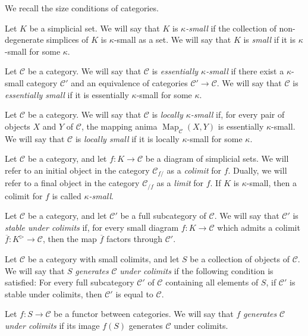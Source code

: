 \documentclass[a4paper,dvipdfmx,11pt,reqno]{amsart}
\DeclareMathOperator{\Map}{Map}
\newcommand{\C}{\mathcal{C}}
\begin{document}
We recall the size conditions of categories.

\begin{definition}
  Let $K$ be a simplicial set.
  We will say that $K$ is \textit{$\kappa$-small} if the collection of non-degenerate simplices of $K$ is $\kappa$-small as a set.
  We will say that $K$ is \textit{small} if it is $\kappa$-small for some $\kappa$.
\end{definition}

\begin{definition}
  Let $\C$ be a category.
  We will say that $\C$ is \textit{essentially $\kappa$-small} if there exist a $\kappa$-small category $\C'$ and an equivalence of categories $\C' \to \C$.
  We will say that $\C$ is \textit{essentially small} if it is essentially $\kappa$-small for some $\kappa$.
\end{definition}

\begin{definition}
  Let $\C$ be a category.
  We will say that $\C$ is \textit{locally $\kappa$-small} if, for every pair of objects $X$ and $Y$ of $\C$, the mapping anima $\Map_{\C}(X,Y)$ is essentially $\kappa$-small.
  We will say that $\C$ is \textit{locally small} if it is locally $\kappa$-small for some $\kappa$.
\end{definition}

\begin{definition}
  Let $\C$ be a category, and let $f : K \to \C$ be a diagram of simplicial sets.
  We will refer to an initial object in the category $\C_{f/}$ as a \textit{colimit} for $f$.
  Dually, we will refer to a final object in the category $\C_{/f}$ as a \textit{limit} for $f$.
  If $K$ is $\kappa$-small, then a colimit for $f$ is called \textit{$\kappa$-small}.
\end{definition}

\begin{definition}
  Let $\C$ be a category, and let $\C'$ be a full subcategory of $\C$.
  We will say that $\C'$ is \textit{stable under colimits} if, for every small diagram $f : K \to \C$ which admits a colimit $\overline{f} : K^\triangleright \to \C$, then the map $\overline{f}$ factors through $\C'$. 

  Let $\C$ be a category with small colimits, and let $S$ be a collection of objects of $\C$.
  We will say that $S$ \textit{generates} $\C$ \textit{under colimits} if the following condition is satisfied:
  For every full subcategory $\C'$ of $\C$ containing all elements of $S$, if $\C'$ is stable under colimits, then $\C'$ is equal to $\C$.

  Let $f : S \to \C$ be a functor between categories.
  We will say that $f$ \textit{generates} $\C$ \textit{under colimits} if its image $f(S)$ generates $\C$ under colimits.
\end{definition}
\end{document}
